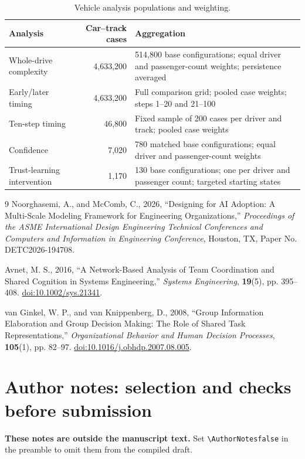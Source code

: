 \documentclass[11pt]{article}
\newif\ifAuthorNotes
\begin{document}
\begin{table}[htbp]
  \centering
  \small
  \caption{Vehicle analysis populations and weighting.}
  \label{tab:samples}
  \begin{tabularx}{\linewidth}{@{}l r X@{}}
    \toprule
    Analysis & Car--track cases & Aggregation \\
    \midrule
    Whole-drive complexity & 4,633,200 & 514,800 base configurations; equal driver and passenger-count weights; persistence averaged \\
    Early/later timing & 4,633,200 & Full comparison grid; pooled case weights; steps 1--20 and 21--100 \\
    Ten-step timing & 46,800 & Fixed sample of 200 cases per driver and track; pooled case weights \\
    Confidence & 7,020 & 780 matched base configurations; equal driver and passenger-count weights \\
    Trust-learning intervention & 1,170 & 130 base configurations; one per driver and passenger count; targeted starting states \\
    \bottomrule
  \end{tabularx}
\end{table}
\FloatBarrier

\begin{thebibliography}{9}
Noorghasemi, A., and McComb, C., 2026,
``Designing for AI Adoption: A Multi-Scale Modeling Framework for Engineering
Organizations,'' \emph{Proceedings of the ASME International Design Engineering
Technical Conferences and Computers and Information in Engineering Conference},
Houston, TX, Paper No. DETC2026-194708.

Avnet, M. S., 2016, ``A Network-Based Analysis of Team Coordination and Shared
Cognition in Systems Engineering,'' \emph{Systems Engineering}, \textbf{19}(5),
pp. 395--408. \href{https://doi.org/10.1002/sys.21341}{doi:10.1002/sys.21341}.

van Ginkel, W. P., and van Knippenberg, D., 2008,
``Group Information Elaboration and Group Decision Making: The Role of Shared
Task Representations,'' \emph{Organizational Behavior and Human Decision
Processes}, \textbf{105}(1), pp. 82--97.
\href{https://doi.org/10.1016/j.obhdp.2007.08.005}{doi:10.1016/j.obhdp.2007.08.005}.
\end{thebibliography}

\ifAuthorNotes
\clearpage
\section*{Author notes: selection and checks before submission}
\textbf{These notes are outside the manuscript text.} Set
\verb|\AuthorNotesfalse| in the preamble to omit them from the compiled draft.
\end{document}
